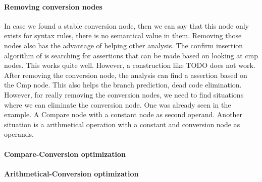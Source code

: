 \paragraph{Removing conversion nodes}
In case we found a stable conversion node, then we can say that this node only exists for syntax rules, there is no semantical value in them. Removing those nodes also has the advantage of helping other analysis. The confirm insertion algorithm of \libFIRM is searching for assertions that can be made based on looking at cmp nodes. This works quite well. However, a construction like TODO does not work.
After removing the conversion node, the analysis can find a assertion based on the Cmp node. This also helps the branch prediction, dead code elimination. \newline
However, for really removing the conversion nodes, we need to find situations where we can eliminate the conversion node. One was already seen in the example. A Compare node with a constant node as second operand. Another situation is a arithmetical operation with a constant and conversion node as operands.

\paragraph{Compare-Conversion optimization}
\paragraph{Arithmetical-Conversion optimization}
